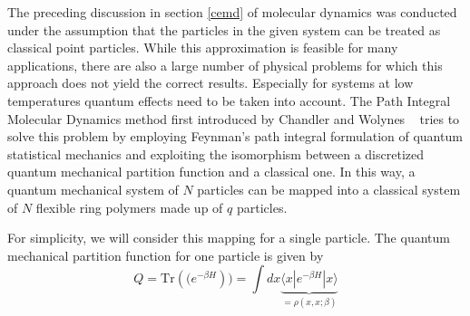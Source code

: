 The preceding discussion in section \ref{cemd} of molecular dynamics was conducted under the assumption that the particles in the given system can be treated as classical point particles. While this approximation is feasible for many applications, there are also a large number of physical problems for which this approach does not yield the correct results. Especially for systems at low temperatures quantum effects need to be taken into account. The Path Integral Molecular Dynamics method first introduced by Chandler and Wolynes ~\cite{Chandler1980} tries to solve this problem by employing Feynman's path integral formulation of quantum statistical mechanics and exploiting the isomorphism between a discretized quantum mechanical partition function and a classical one. In this way, a quantum mechanical system of $N$ particles can be mapped into a classical system of $N$ flexible ring polymers made up of $q$ particles. 

For simplicity, we will consider this mapping for a single particle. The quantum mechanical partition function for one particle is given by 
\begin{equation}
Q = \text{Tr}\left((e^{-\beta H}\right)) = \int dx \underbrace{\langle x | e^{-\beta H} | x \rangle}_{=\rho(x, x; \beta)}
\end{equation}


